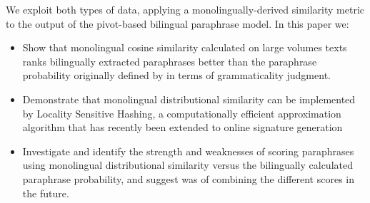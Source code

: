 \documentclass[11pt]{article}
\begin{document}

We exploit both types of data, applying a monolingually-derived similarity metric to the output of the pivot-based bilingual paraphrase model.  In this paper we:
\begin{itemize}
\item Show that monolingual cosine similarity calculated on large volumes texts ranks bilingually extracted paraphrases better than the paraphrase probability originally defined by  in terms of grammaticality judgment.
\item Demonstrate that monolingual distributional similarity can be implemented by Locality Sensitive Hashing, a computationally efficient approximation algorithm that has recently been extended to online signature generation \cite{Charikar02,VanDurmeLallACL10}
\item Investigate and identify the strength and weaknesses of scoring paraphrases using monolingual distributional similarity versus the bilingually calculated paraphrase probability, and suggest was of combining the different scores in the future.
\end{itemize}



%
\end{document}
